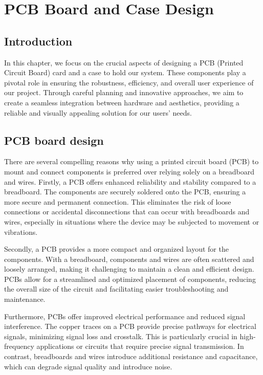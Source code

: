 %
%



\chapter{PCB Board and Case Design}
\section{Introduction}
In this chapter, we focus on the crucial aspects of designing a PCB (Printed Circuit Board) card and a case to hold our system. These components play a pivotal role in ensuring the robustness, efficiency, and overall user experience of our project. Through careful planning and innovative approaches, we aim to create a seamless integration between hardware and aesthetics, providing a reliable and visually appealing solution for our users' needs.
\section{ PCB board  design}
There are several compelling reasons why using a printed circuit board (PCB) to mount and connect components is preferred over relying solely on a breadboard and wires. Firstly, a PCB offers enhanced reliability and stability compared to a breadboard. The components are securely soldered onto the PCB, ensuring a more secure and permanent connection. This eliminates the risk of loose connections or accidental disconnections that can occur with breadboards and wires, especially in situations where the device may be subjected to movement or vibrations.\cite{And}

Secondly, a PCB provides a more compact and organized layout for the components. With a breadboard, components and wires are often scattered and loosely arranged, making it challenging to maintain a clean and efficient design. PCBs allow for a streamlined and optimized placement of components, reducing the overall size of the circuit and facilitating easier troubleshooting and maintenance.\cite{And}

Furthermore, PCBs offer improved electrical performance and reduced signal interference. The copper traces on a PCB provide precise pathways for electrical signals, minimizing signal loss and crosstalk. This is particularly crucial in high-frequency applications or circuits that require precise signal transmission. In contrast, breadboards and wires introduce additional resistance and capacitance, which can degrade signal quality and introduce noise.\cite{And}

